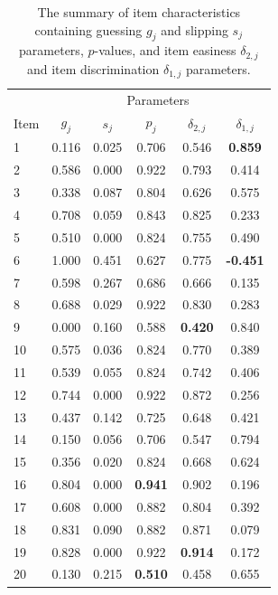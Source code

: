 \documentclass[english]{pwr_wmat_praca_dyplomowa}
\theoremstyle{plain}
\numberwithin{theorem}{chapter}
\theoremstyle{definition}
\numberwithin{theorem}{chapter}
\begin{document}
	\begin{table}[h]
		\centering
		\begin{tabular}{l c c c c c} 
			\hline
			{\rule{0pt}{3ex}} & \multicolumn{5}{c}{Parameters}\\
			Item & $g_j$ & $s_j$ & $p_j$ & $\delta_{2,j}$ & $\delta_{1,j}$ \\
			\hline
			{\rule{0pt}{3ex}}1 & 0.116 & 0.025 & 0.706 & 0.546 & \textbf{0.859} \\
			2 & 0.586 & 0.000 & 0.922 & 0.793 & 0.414 \\ 
			3 & 0.338 & 0.087 & 0.804 & 0.626 & 0.575 \\ 
			4 & 0.708 & 0.059 & 0.843 & 0.825 & 0.233 \\
			5 & 0.510 & 0.000 & 0.824 & 0.755 & 0.490 \\
			6 & 1.000 & 0.451 & 0.627 & 0.775 & \textbf{-0.451} \\
			7 & 0.598 & 0.267 & 0.686 & 0.666 & 0.135 \\
			8 & 0.688 & 0.029 & 0.922 & 0.830 & 0.283 \\
			9 & 0.000 & 0.160 & 0.588 & \textbf{0.420} & 0.840 \\
			10 & 0.575 & 0.036 & 0.824 & 0.770 & 0.389 \\
			11 & 0.539 & 0.055 & 0.824 & 0.742 & 0.406 \\
			12 & 0.744 & 0.000 & 0.922 & 0.872 & 0.256 \\
			13 & 0.437 & 0.142 & 0.725 & 0.648 & 0.421 \\
			14 & 0.150 & 0.056 & 0.706 & 0.547 & 0.794 \\
			15 & 0.356 & 0.020 & 0.824 & 0.668 & 0.624 \\
			16 & 0.804 & 0.000 & \textbf{0.941} & 0.902 & 0.196 \\
			17 & 0.608 & 0.000 & 0.882 & 0.804 & 0.392 \\
			18 & 0.831 & 0.090 & 0.882 & 0.871 & 0.079 \\
			19 & 0.828 & 0.000 & 0.922 & \textbf{0.914} & 0.172 \\
			20 & 0.130 & 0.215 & \textbf{0.510} & 0.458 & 0.655\\ [0.5ex] 
			\hline
		\end{tabular}
		\caption{The summary of item characteristics containing guessing $g_j$ and slipping $s_j$ parameters, $p$-values, and item easiness $\delta_{2,j}$ and item discrimination $\delta_{1,j}$ parameters.}
		\label{tab:item_param} 
	\end{table}
	
\end{document}
